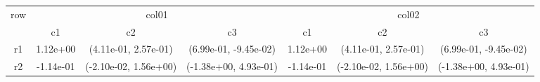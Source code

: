 \begin{tabular}{ccccccc}
\toprule
\multirow{2}{*}{row}&\multicolumn{3}{c}{col01}&\multicolumn{3}{c}{col02}\tabularnewline
\cmidrule(lr){2-4}
\cmidrule(lr){5-7}
&c1&c2&c3&c1&c2&c3\tabularnewline
\midrule
r1&1.12e+00& (4.11e-01, 2.57e-01)& (6.99e-01, -9.45e-02)&1.12e+00& (4.11e-01, 2.57e-01)& (6.99e-01, -9.45e-02)\tabularnewline
r2&-1.14e-01& (-2.10e-02, 1.56e+00)& (-1.38e+00, 4.93e-01)&-1.14e-01& (-2.10e-02, 1.56e+00)& (-1.38e+00, 4.93e-01)\tabularnewline
\bottomrule
\end{tabular}
